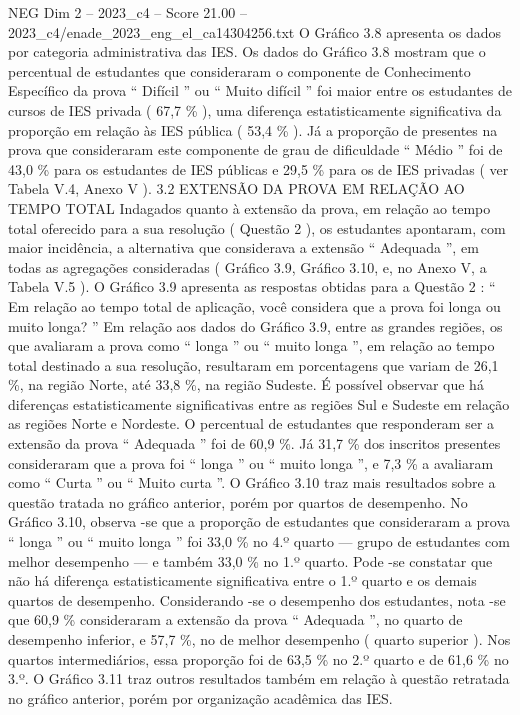 \begin{textsample}{NEG Dim 2 – 2023\_c4 – Score 21.00 – 2023\_c4/enade\_2023\_eng\_el\_ca14304256.txt}
O Gráfico 3.8 apresenta os dados por categoria administrativa das IES.
Os dados do Gráfico 3.8 mostram que o percentual de estudantes que consideraram o componente de Conhecimento Específico da prova “ Difícil ” ou “ Muito difícil ” foi maior entre os estudantes de cursos de IES privada ( 67,7 \% ), uma diferença estatisticamente significativa da proporção em relação às IES pública ( 53,4 \% ).
Já a proporção de presentes na prova que consideraram este componente de grau de dificuldade “ Médio ” foi de 43,0 \% para os estudantes de IES públicas e 29,5 \% para os de IES privadas ( ver Tabela V.4, Anexo V ). 3.2 EXTENSÃO DA PROVA EM RELAÇÃO AO TEMPO TOTAL Indagados quanto à extensão da prova, em relação ao tempo total oferecido para a sua resolução ( Questão 2 ), os estudantes apontaram, com maior incidência, a alternativa que considerava a extensão “ Adequada ”, em todas as agregações consideradas ( Gráfico 3.9, Gráfico 3.10, e, no Anexo V, a Tabela V.5 ).
O Gráfico 3.9 apresenta as respostas obtidas para a Questão 2 : “ Em relação ao tempo total de aplicação, você considera que a prova foi longa ou muito longa? ” Em relação aos dados do Gráfico 3.9, entre as grandes regiões, os que avaliaram a prova como “ longa ” ou “ muito longa ”, em relação ao tempo total destinado a sua resolução, resultaram em porcentagens que variam de 26,1 \%, na região Norte, até 33,8 \%, na região Sudeste.
É possível observar que há diferenças estatisticamente significativas entre as regiões Sul e Sudeste em relação as regiões Norte e Nordeste.
O percentual de estudantes que responderam ser a extensão da prova “ Adequada ” foi de 60,9 \%.
Já 31,7 \% dos inscritos presentes consideraram que a prova foi “ longa ” ou “ muito longa ”, e 7,3 \% a avaliaram como “ Curta ” ou “ Muito curta ”.
O Gráfico 3.10 traz mais resultados sobre a questão tratada no gráfico anterior, porém por quartos de desempenho.
No Gráfico 3.10, observa -se que a proporção de estudantes que consideraram a prova “ longa ” ou “ muito longa ” foi 33,0 \% no 4.º quarto — grupo de estudantes com melhor desempenho — e também 33,0 \% no 1.º quarto.
Pode -se constatar que não há diferença estatisticamente significativa entre o 1.º quarto e os demais quartos de desempenho.
Considerando -se o desempenho dos estudantes, nota -se que 60,9 \% consideraram a extensão da prova “ Adequada ”, no quarto de desempenho inferior, e 57,7 \%, no de melhor desempenho ( quarto superior ).
Nos quartos intermediários, essa proporção foi de 63,5 \% no 2.º quarto e de 61,6 \% no 3.º.
O Gráfico 3.11 traz outros resultados também em relação à questão retratada no gráfico anterior, porém por organização acadêmica das IES.

\end{textsample}
